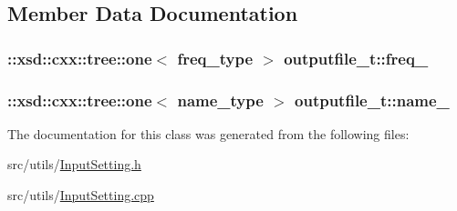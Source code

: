 \subsection{Member Data Documentation}
\hypertarget{classoutputfile__t_a7d4cbfeeb02491ef8dfe4df991e3e85f}{
\subsubsection[{freq\-\_\-}]{\setlength{\rightskip}{0pt plus 5cm}\-::xsd\-::cxx\-::tree\-::one$<$ {\bf freq\-\_\-type} $>$ outputfile\-\_\-t\-::freq\-\_\-\hspace{0.3cm}{\ttfamily [protected]}}}\label{classoutputfile__t_a7d4cbfeeb02491ef8dfe4df991e3e85f}
\hypertarget{classoutputfile__t_a593a1f4fb1a7e2c1f9cace3a5fc9bc11}{
\subsubsection[{name\-\_\-}]{\setlength{\rightskip}{0pt plus 5cm}\-::xsd\-::cxx\-::tree\-::one$<$ {\bf name\-\_\-type} $>$ outputfile\-\_\-t\-::name\-\_\-\hspace{0.3cm}{\ttfamily [protected]}}}\label{classoutputfile__t_a593a1f4fb1a7e2c1f9cace3a5fc9bc11}


The documentation for this class was generated from the following files\-:\begin{DoxyCompactItemize}
\item 
src/utils/\hyperlink{InputSetting_8h}{Input\-Setting.\-h}\item 
src/utils/\hyperlink{InputSetting_8cpp}{Input\-Setting.\-cpp}\end{DoxyCompactItemize}
